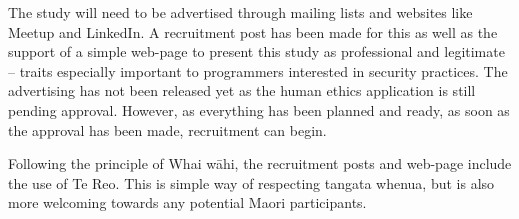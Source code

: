 \par The study will need to be advertised through mailing lists and websites like Meetup and LinkedIn. A recruitment post has been made for this as well as the support of a simple web-page to present this study as professional and legitimate – traits especially important to programmers interested in security practices. The advertising has not been released yet as the human ethics application is still pending approval. However, as everything has been planned and ready, as soon as the approval has been made, recruitment can begin. 
\newline
\par Following the principle of Whai wāhi, the recruitment posts and web-page include the use of Te Reo. This is simple way of respecting tangata whenua, but is also more welcoming towards any potential Maori participants.







